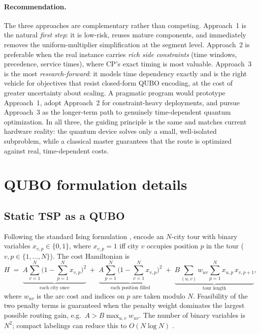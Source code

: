 \documentclass[11pt]{article}
\begin{document}
\paragraph{Recommendation.}
The three approaches are complementary rather than competing. Approach~1 is the natural
\emph{first step}: it is low-risk, reuses mature components, and immediately removes the
uniform-multiplier simplification at the segment level. Approach~2 is preferable when the
real instance carries \emph{rich side constraints} (time windows, precedence, service
times), where CP's exact timing is most valuable. Approach~3 is the most
\emph{research-forward}: it models time dependency exactly and is the right vehicle for
objectives that resist closed-form QUBO encoding, at the cost of greater uncertainty about
scaling. A pragmatic program would prototype Approach~1, adopt Approach~2 for
constraint-heavy deployments, and pursue Approach~3 as the longer-term path to genuinely
time-dependent quantum optimization. In all three, the guiding principle is the same and
matches current hardware reality: the quantum device solves only a small, well-isolated
subproblem, while a classical master guarantees that the route is optimized against real,
time-dependent costs.

\printbibliography[heading=bibintoc,title={References}]

\appendix

\section{QUBO formulation details}
\label{app:qubo}

\subsection{Static TSP as a QUBO}
Following the standard Ising formulation \cite{lucas2014ising}, encode an $N$-city tour
with binary variables $x_{v,p}\in\{0,1\}$, where $x_{v,p}=1$ iff city $v$ occupies
position $p$ in the tour ($v,p \in \{1,\dots,N\}$). The cost Hamiltonian is
\[
  H \;=\; \underbrace{A\sum_{v=1}^{N}\Big(1-\sum_{p=1}^{N}x_{v,p}\Big)^{2}}_{\text{each city once}}
       \;+\; \underbrace{A\sum_{p=1}^{N}\Big(1-\sum_{v=1}^{N}x_{v,p}\Big)^{2}}_{\text{each position filled}}
       \;+\; \underbrace{B\sum_{(u,v)} w_{uv}\sum_{p=1}^{N} x_{u,p}\,x_{v,p+1}}_{\text{tour length}},
\]
where $w_{uv}$ is the arc cost and indices on $p$ are taken modulo $N$. Feasibility of the
two penalty terms is guaranteed when the penalty weight dominates the largest possible
routing gain, e.g.\ $A > B\max_{u,v} w_{uv}$. The number of binary variables is $N^{2}$;
compact labelings can reduce this to $O(N\log N)$ \cite{koshikawa2024efficient}.
\end{document}
